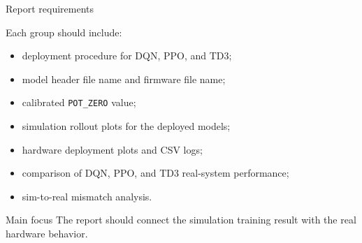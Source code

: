 \documentclass[aspectratio=169]{beamer}
\begin{document}
\begin{frame}{Report requirements}

Each group should include:

\begin{itemize}
    \item deployment procedure for DQN, PPO, and TD3;
    \vspace{0.12cm}

    \item model header file name and firmware file name;
    \vspace{0.12cm}

    \item calibrated \texttt{POT\_ZERO} value;
    \vspace{0.12cm}

    \item simulation rollout plots for the deployed models;
    \vspace{0.12cm}

    \item hardware deployment plots and CSV logs;
    \vspace{0.12cm}

    \item comparison of DQN, PPO, and TD3 real-system performance;
    \vspace{0.12cm}

    \item sim-to-real mismatch analysis.
\end{itemize}

\vspace{0.15cm}

\begin{block}{Main focus}
\small
The report should connect the simulation training result with the real hardware behavior.
\end{block}

\end{frame}
\end{document}

